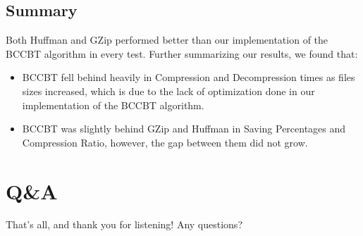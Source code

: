 \documentclass{beamer}
\begin{document}
\begin{frame}
\end{frame}
\subsection{Summary}
\begin{frame}
    Both Huffman and GZip performed better than our implementation of the BCCBT algorithm in every test.
    Further summarizing our results, we found that:
    \begin{itemize}
        \item{BCCBT fell behind heavily in Compression and Decompression times as files
        sizes increased, which is due to the lack of optimization done in our
        implementation of the BCCBT algorithm.}
        \item{BCCBT was slightly behind GZip and Huffman in Saving Percentages and Compression Ratio, however,
        the gap between them did not grow.}
    \end{itemize}
\end{frame}

\section{Q\&A}
\begin{frame}
That's all, and thank you for listening! Any questions?
\end{frame}
\end{document}
